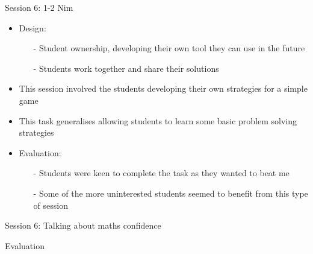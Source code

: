 \documentclass{beamer}  %
\begin{document}
\begin{frame}{Session 6: 1-2 Nim}
    \begin{itemize}
        \item Design:
        \begin{itemize}
            \item[-] Student ownership, developing their own tool they can use in the future
            \item[-] Students work together and share their solutions
        \end{itemize}
        \item This session involved the students developing their own strategies for a simple game
        \item This task generalises allowing students to learn some basic problem solving strategies
        \item Evaluation:
        \begin{itemize}
            \item[-] Students were keen to complete the task as they wanted to beat me
            \item[-] Some of the more uninterested students seemed to benefit from this type of session
        \end{itemize}
    \end{itemize}
\end{frame}

\begin{frame}{Session 6: Talking about maths confidence}

\end{frame}

\begin{frame}{Evaluation}

\end{frame}
\end{document}
